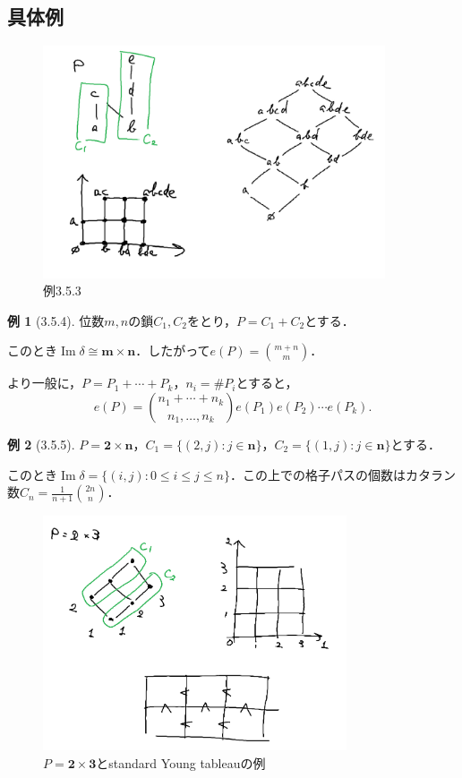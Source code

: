 \documentclass[xelatex,ja=standard,a4paper,14pt,everyparhook=compat]{bxjsarticle}
\DeclareMathOperator{\image}{Im}
\theoremstyle{definition}
\newtheorem*{example*}{例}
\begin{document}
\subsection{具体例}

\begin{figure}[ht]
    \centering
    \includegraphics[width=0.9\textwidth]{gamma.png}
    \caption{例3.5.3}
\end{figure}

\begin{example*}[3.5.4]
    位数$m,n$の鎖$C_1,C_2$をとり，$P = C_1 + C_2$とする．

    このとき$\image \delta \cong \bm{m} \times \bm{n}$．したがって$e(P) = \binom{m+n}{m}$．

    より一般に，$P = P_1 + \cdots + P_k$，$n_i = \#P_i$とすると， \begin{equation*}
        e(P) = \binom{n_1+\cdots+n_k}{n_1,\ldots,n_k} e(P_1) e(P_2) \cdots e(P_k).
    \end{equation*}
\end{example*}

\begin{example*}[3.5.5]
    $P = \bm{2} \times \bm{n}$，$C_1 = \{(2,j) : j \in \bm{n}\}$，$C_2 = \{(1,j):j \in \bm{n}\}$とする．

    このとき$\image \delta = \{(i,j) : 0 \leq i \leq j \leq n\}$．この上での格子パスの個数はカタラン数$C_n = \frac{1}{n+1}\binom{2n}{n}$．
\end{example*}
\begin{figure}[ht]
    \centering
    \includegraphics[width=0.8\textwidth]{Fig3.11.png}
    \caption{$P = \bm2 \times \bm3$とstandard Young tableauの例}
\end{figure}
\end{document}
